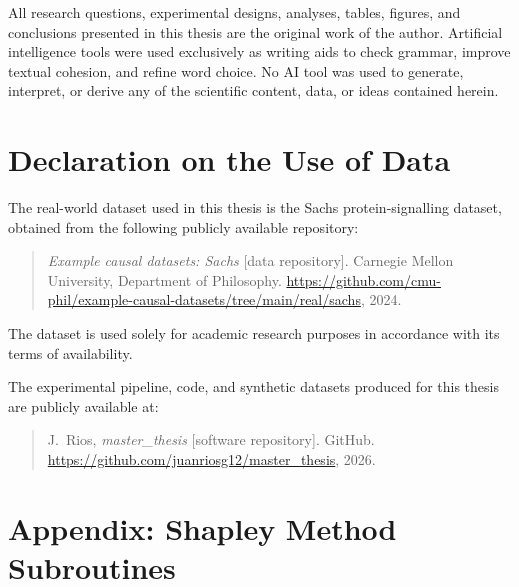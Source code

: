 \documentclass[12pt,a4paper,oneside]{article}
\begin{document}
All research questions, experimental designs, analyses, tables, figures, and conclusions presented in this thesis are the original work of the author. Artificial intelligence tools were used exclusively as writing aids to check grammar, improve textual cohesion, and refine word choice. No AI tool was used to generate, interpret, or derive any of the scientific content, data, or ideas contained herein.

\section*{Declaration on the Use of Data}

The real-world dataset used in this thesis is the Sachs protein-signalling dataset, obtained from the following publicly available repository:

\begin{quote}
\textit{Example causal datasets: Sachs} [data repository]. Carnegie Mellon University, Department of Philosophy. \url{https://github.com/cmu-phil/example-causal-datasets/tree/main/real/sachs}, 2024.
\end{quote}

The dataset is used solely for academic research purposes in accordance with its terms of availability.

The experimental pipeline, code, and synthetic datasets produced for this thesis are publicly available at:

\begin{quote}
J.\ Rios, \textit{master\_thesis} [software repository]. GitHub. \url{https://github.com/juanriosg12/master_thesis}, 2026.
\end{quote}

\newpage


\newpage
\appendix
{}%
{}
\section*{Appendix: Shapley Method Subroutines}
\label{app:subroutines}
\end{document}
